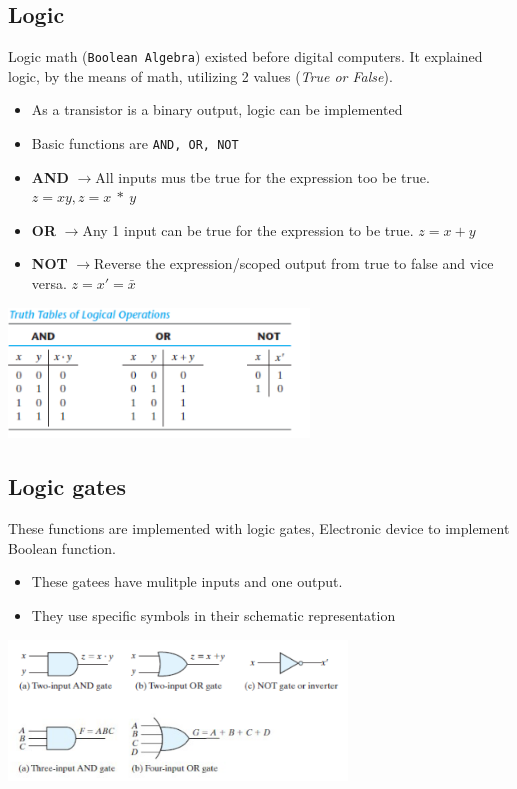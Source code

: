 \documentclass[a4paper,12pt]{article}
\newcommand{\ra}{$\rightarrow$}
\begin{document}
        \subsection*{Logic}
        Logic math (\texttt{Boolean Algebra}) existed before digital computers. It explained logic, by the means of math, utilizing 2 values (\textit{True or False}).
        \begin{itemize}
            \item As a transistor is a binary output, logic can be implemented
            \item Basic functions are \texttt{AND, OR, NOT}
        \end{itemize}
        \hrulefill
        \begin{itemize}
            \item \textbf{AND} \ra All inputs mus tbe true for the expression too be true. $z=xy,z=x~*~y$
            \item \textbf{OR} \ra Any 1 input can be true for the expression to be true. $z=x+y$
            \item \textbf{NOT} \ra Reverse the expression/scoped output from true to false and vice versa. $z=x'=\bar{x}$
        \end{itemize}
        \begin{center}\includegraphics[width=8cm]{Truth Tables.png}\end{center}

        \subsection*{Logic gates}
            These functions are implemented with logic gates, Electronic device to implement Boolean function.
            \begin{itemize}
                \item These gatees have mulitple inputs and one output.
                \item They use specific symbols in their schematic representation
            \end{itemize}
            \begin{center}\includegraphics[width=9cm]{Logic Gates.png}\end{center}
\end{document}
